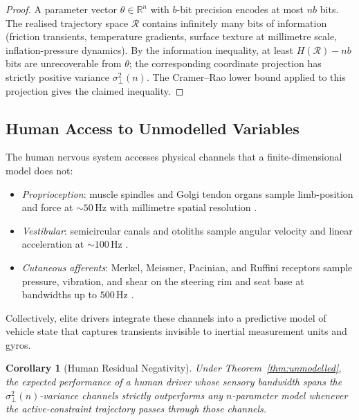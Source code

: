 \documentclass[11pt,twocolumn]{article}
\newtheorem{corollary}[theorem]{Corollary}
\theoremstyle{definition}
\theoremstyle{remark}
\newcommand{\R}{\mathbb{R}}
\providecommand{\cR}{\mathcal{R}}
\begin{document}
\begin{proof}
A parameter vector $\theta \in \R^n$ with $b$-bit precision encodes at most $nb$ bits. The realised trajectory space $\cR$ contains infinitely many bits of information (friction transients, temperature gradients, surface texture at millimetre scale, inflation-pressure dynamics). By the information inequality, at least $H(\cR) - nb$ bits are unrecoverable from $\theta$; the corresponding coordinate projection has strictly positive variance $\sigma^2_{\perp}(n)$. The Cramer--Rao lower bound \cite{kay1993fundamentals,cramer1946mathematical} applied to this projection gives the claimed inequality.
\end{proof}

\subsection{Human Access to Unmodelled Variables}

The human nervous system accesses physical channels that a finite-dimensional model does not:

\begin{itemize}[leftmargin=*,itemsep=2pt]
\item \emph{Proprioception}: muscle spindles and Golgi tendon organs sample limb-position and force at $\sim 50\,\mathrm{Hz}$ with millimetre spatial resolution \cite{kandel2013principles,shadmehr2005biology,enoka2015neuromechanics}.
\item \emph{Vestibular}: semicircular canals and otoliths sample angular velocity and linear acceleration at $\sim 100\,\mathrm{Hz}$ \cite{kandel2013principles}.
\item \emph{Cutaneous afferents}: Merkel, Meissner, Pacinian, and Ruffini receptors sample pressure, vibration, and shear on the steering rim and seat base at bandwidths up to $500\,\mathrm{Hz}$ \cite{kandel2013principles,enoka2015neuromechanics}.
\end{itemize}

\noindent Collectively, elite drivers integrate these channels into a predictive model of vehicle state that captures transients invisible to inertial measurement units and gyros.

\begin{corollary}[Human Residual Negativity]\label{cor:human-residual}
Under Theorem~\ref{thm:unmodelled}, the expected performance of a human driver whose sensory bandwidth spans the $\sigma^2_{\perp}(n)$-variance channels strictly outperforms any $n$-parameter model whenever the active-constraint trajectory passes through those channels.
\end{corollary}
\end{document}
